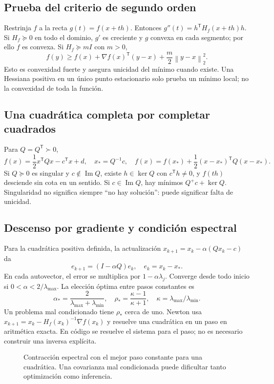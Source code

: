 \documentclass[11pt,a4paper]{article}
\newcommand{\T}{^{\mathsf T}}
\newcommand{\norm}[1]{\left\lVert #1\right\rVert}
\DeclareMathOperator{\kerop}{ker}
\DeclareMathOperator{\range}{Im}
\theoremstyle{definition}
\begin{document}
\subsection{Prueba del criterio de segundo orden}
Restrinja $f$ a la recta $g(t)=f(x+th)$. Entonces $g''(t)=h\T H_f(x+th)h$. Si $H_f\succeq0$ en todo el dominio, $g'$ es creciente y $g$ convexa en cada segmento; por ello $f$ es convexa. Si $H_f\succeq mI$ con $m>0$,
\[
f(y)\ge f(x)+\nabla f(x)\T(y-x)+\frac m2\norm{y-x}_2^2.
\]
Esto es convexidad fuerte y asegura unicidad del mínimo cuando existe. Una Hessiana positiva en un único punto estacionario solo prueba un mínimo local; no la convexidad de toda la función.
\subsection{Una cuadrática completa por completar cuadrados}
Para $Q=Q\T\succ0$,
\[
f(x)=\frac12x\T Qx-c\T x+d,
\quad x_*=Q^{-1}c,
\quad f(x)=f(x_*)+\frac12(x-x_*)\T Q(x-x_*).
\]
Si $Q\succeq0$ es singular y $c\notin\range Q$, existe $h\in\kerop Q$ con $c\T h\ne0$, y $f(th)$ desciende sin cota en un sentido. Si $c\in\range Q$, hay mínimos $Q^+c+\kerop Q$. Singularidad no significa siempre ``no hay solución'': puede significar falta de unicidad.
\subsection{Descenso por gradiente y condición espectral}
Para la cuadrática positiva definida, la actualización $x_{k+1}=x_k-\alpha(Qx_k-c)$ da
\[
e_{k+1}=(I-\alpha Q)e_k,\quad e_k=x_k-x_*.
\]
En cada autovector, el error se multiplica por $1-\alpha\lambda_j$. Converge desde todo inicio si $0<\alpha<2/\lambda_{\max}$. La elección óptima entre pasos constantes es
\[
\alpha_*=\frac2{\lambda_{\max}+\lambda_{\min}},\quad
\rho_*=\frac{\kappa-1}{\kappa+1},\quad
\kappa=\lambda_{\max}/\lambda_{\min}.
\]
Un problema mal condicionado tiene $\rho_*$ cerca de uno. Newton usa $x_{k+1}=x_k-H_f(x_k)^{-1}\nabla f(x_k)$ y resuelve una cuadrática en un paso en aritmética exacta. En código se resuelve el sistema para el paso; no es necesario construir una inversa explícita.
\begin{figure}[H]\centering
{}
\caption{Contracción espectral con el mejor paso constante para una cuadrática. Una covarianza mal condicionada puede dificultar tanto optimización como inferencia.}
\end{figure}
\end{document}
